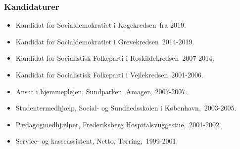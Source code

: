 \documentclass[11pt, a4paper]{awesome-cv}
\begin{document}
\begin{cvletter}
\subsubsection*{Kandidaturer}
\begin{itemize}
\item Kandidat for Socialdemokratiet i Køgekredsen fra 2019.
\item Kandidat for Socialdemokratiet i Grevekredsen 2014-2019.
\item Kandidat for Socialistisk Folkeparti i Roskildekredsen 2007-2014.
\item Kandidat for Socialistisk Folkeparti i Vejlekredsen 2001-2006.
\end{itemize}
\begin{itemize}
\item Ansat i hjemmeplejen, Sundparken, Amager, 2007-2007.
\item Studentermedhjælp, Social- og Sundhedsskolen i København, 2003-2005.
\item Pædagogmedhjælper, Frederiksberg Hospitalsvuggestue, 2001-2002.
\item Service- og kasseassistent, Netto, Tørring, 1999-2001.
\end{itemize}
\end{cvletter}
\end{document}
